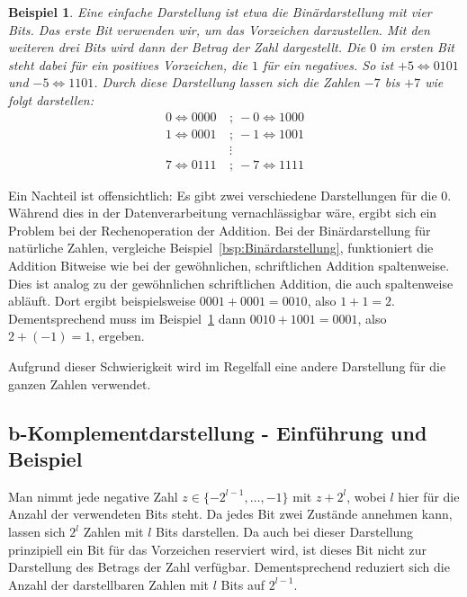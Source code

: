 \documentclass{article}
\newtheorem{beispiel}[satz]{Beispiel}
\begin{document}
  \begin{beispiel} \label{bsp:Binärdarstellung_Vorzeichen}
    Eine einfache Darstellung ist etwa die Binärdarstellung mit vier Bits.
    Das erste Bit verwenden wir, um das Vorzeichen darzustellen.
    Mit den weiteren drei Bits wird dann der Betrag der Zahl dargestellt.
    Die $0$ im ersten Bit steht dabei für ein positives Vorzeichen, die $1$ für ein negatives.
    So ist $+5 \Leftrightarrow 0101$ und $-5 \Leftrightarrow 1101$.
    Durch diese Darstellung lassen sich die Zahlen $-7$ bis $+7$ wie folgt darstellen:
    \begin{align*}
      0 \Leftrightarrow 0000  ~&;~  -0 \Leftrightarrow 1000 \\
      1 \Leftrightarrow 0001  ~&;~  -1 \Leftrightarrow 1001 \\
      & \vdots \\
      7 \Leftrightarrow 0111  ~&;~  -7 \Leftrightarrow 1111
    \end{align*}
  \end{beispiel}

  \vspace{\baselineskip}
  
  Ein Nachteil ist offensichtlich: Es gibt zwei verschiedene Darstellungen für die $0$.
  Während dies in der Datenverarbeitung vernachlässigbar wäre, ergibt sich ein Problem bei der Rechenoperation der Addition.
  Bei der Binärdarstellung für natürliche Zahlen, vergleiche Beispiel~\ref{bsp:Binärdarstellung}, funktioniert die Addition Bitweise wie bei der gewöhnlichen, schriftlichen Addition spaltenweise.
  Dies ist analog zu der gewöhnlichen schriftlichen Addition, die auch spaltenweise abläuft.
  Dort ergibt beispielsweise $0001 + 0001 = 0010$, also $1+1=2$. 
  Dementsprechend muss im Beispiel~\ref{bsp:Binärdarstellung_Vorzeichen} dann $0010+1001=0001$, also $2+(-1)=1$, ergeben.

  \vspace{\baselineskip}

  Aufgrund dieser Schwierigkeit wird im Regelfall eine andere Darstellung für die ganzen Zahlen verwendet.

  \subsection{b-Komplementdarstellung - Einführung und Beispiel}

    Man nimmt jede negative Zahl $z\in \{-2^{l-1},\dots,-1\}$ mit $z+2^l$, wobei $l$ hier für die Anzahl der verwendeten Bits steht. 
    Da jedes Bit zwei Zustände annehmen kann, lassen sich $2^l$ Zahlen mit $l$ Bits darstellen.
    Da auch bei dieser Darstellung prinzipiell ein Bit für das Vorzeichen reserviert wird, ist dieses Bit nicht zur Darstellung des Betrags der Zahl verfügbar.
    Dementsprechend reduziert sich die Anzahl der darstellbaren Zahlen mit $l$ Bits auf $2^{l-1}$.
\end{document}
